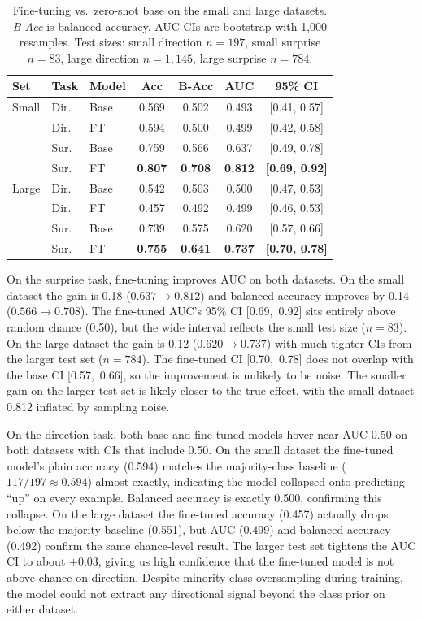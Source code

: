 \documentclass[11pt]{article}
\begin{document}
\begin{table}[!ht]
\centering
\small
\setlength{\tabcolsep}{4pt}
\begin{tabular}{lllcccc}
\toprule
\textbf{Set} & \textbf{Task} & \textbf{Model} & \textbf{Acc} & \textbf{B-Acc} & \textbf{AUC} & \textbf{95\% CI} \\
\midrule
Small & Dir. & Base & 0.569 & 0.502 & 0.493 & [0.41, 0.57] \\
      & Dir. & FT   & 0.594 & 0.500 & 0.499 & [0.42, 0.58] \\
      & Sur.  & Base & 0.759 & 0.566 & 0.637 & [0.49, 0.78] \\
      & Sur.  & FT   & \textbf{0.807} & \textbf{0.708} & \textbf{0.812} & \textbf{[0.69, 0.92]} \\
\midrule
Large & Dir. & Base & 0.542 & 0.503 & 0.500 & [0.47, 0.53] \\
      & Dir. & FT   & 0.457 & 0.492 & 0.499 & [0.46, 0.53] \\
      & Sur.  & Base & 0.739 & 0.575 & 0.620 & [0.57, 0.66] \\
      & Sur.  & FT   & \textbf{0.755} & \textbf{0.641} & \textbf{0.737} & \textbf{[0.70, 0.78]} \\
\bottomrule
\end{tabular}
\caption{Fine-tuning vs.\ zero-shot base on the small and large
datasets. \emph{B-Acc} is balanced accuracy. AUC CIs are bootstrap
with 1{,}000 resamples. Test sizes: small direction $n=197$, small
surprise $n=83$, large direction $n=1{,}145$, large surprise
$n=784$.}
\label{tab:ft-results}
\end{table}

On the surprise task, fine-tuning improves AUC on both datasets. On
the small dataset the gain is 0.18 ($0.637\rightarrow0.812$) and
balanced accuracy improves by 0.14 ($0.566\rightarrow0.708$). The
fine-tuned AUC's 95\% CI \mbox{[0.69, 0.92]} sits entirely above
random chance (0.50), but the wide interval reflects the small test
size ($n=83$). On the large dataset the gain is 0.12
($0.620\rightarrow0.737$) with much tighter CIs from the larger
test set ($n=784$). The fine-tuned CI \mbox{[0.70, 0.78]} does not
overlap with the base CI \mbox{[0.57, 0.66]}, so the improvement is
unlikely to be noise. The smaller gain on the larger test set is
likely closer to the true effect, with the small-dataset 0.812
inflated by sampling noise.

On the direction task, both base and fine-tuned models hover near
AUC 0.50 on both datasets with CIs that include 0.50. On the small
dataset the fine-tuned model's plain accuracy (0.594) matches the
majority-class baseline ($117/197\approx0.594$) almost exactly,
indicating the model collapsed onto predicting ``up'' on every
example. Balanced accuracy is exactly 0.500, confirming this
collapse. On the large dataset the fine-tuned accuracy (0.457)
actually drops below the majority baseline (0.551), but AUC (0.499)
and balanced accuracy (0.492) confirm the same chance-level result.
The larger test set tightens the AUC CI to about $\pm 0.03$, giving
us high confidence that the fine-tuned model is not above chance on
direction. Despite minority-class oversampling during training, the
model could not extract any directional signal beyond the class
prior on either dataset.
\end{document}
